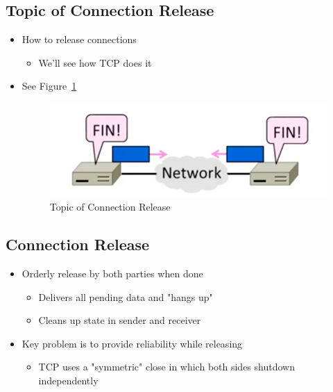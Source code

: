 \documentclass[12pt]{ctexart}   %
\begin{document}
	\subsection{ Topic of Connection Release }
	\begin{itemize}
		\item How to release connections
		\begin{itemize}
			\item We'll see how TCP does it
		\end{itemize}
		 \item See Figure~\ref{fig:6-4-1}
		  
		 \begin{figure}[h!] %
		\centering
		 \includegraphics[scale=0.7]{images/6-4-1}
		\caption{  Topic of Connection Release }
		 \label{fig:6-4-1}
		 \end{figure}
	\end{itemize}
	
	\subsection{Connection Release}
	\begin{itemize}
		\item Orderly release by both parties when done
		\begin{itemize}
			\item Delivers all pending data and "hangs up"
			\item Cleans up state in sender and receiver
		\end{itemize}
		
		\item Key problem is to provide reliability while releasing
		\begin{itemize}
			\item TCP uses a "symmetric" close in which both sides shutdown independently
		\end{itemize}
	\end{itemize}
	
\end{document}
